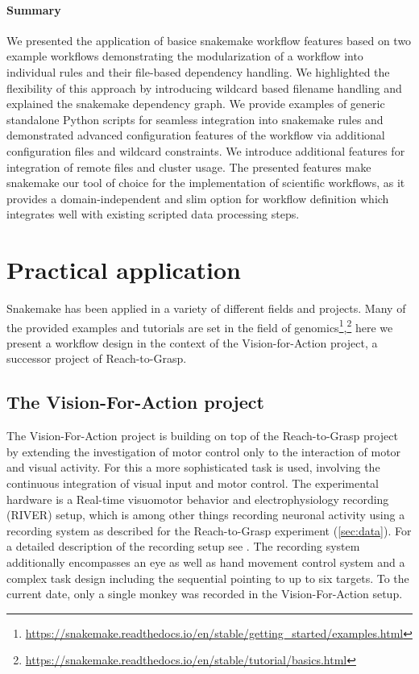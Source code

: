 \paragraph{Summary}
We presented the application of basice snakemake workflow features based on two example workflows demonstrating the modularization of a workflow into individual rules and their file-based dependency handling. We highlighted the flexibility of this approach by introducing wildcard based filename handling and explained the snakemake dependency graph. We provide examples of generic standalone Python scripts for seamless integration into snakemake rules and demonstrated advanced configuration features of the workflow via additional configuration files and wildcard constraints. We introduce additional features for integration of remote files and cluster usage.
The presented features make snakemake our tool of choice for the implementation of scientific workflows, as it provides a domain-independent and slim option for workflow definition which integrates well with existing scripted data processing steps.


\section{Practical application}
Snakemake has been applied in a variety of different fields and projects. Many of the provided examples and tutorials are set in the field of genomics\footnote{\url{https://snakemake.readthedocs.io/en/stable/getting_started/examples.html}},\footnote{\url{https://snakemake.readthedocs.io/en/stable/tutorial/basics.html}} here we present a workflow design in the context of the Vision-for-Action project, a successor project of Reach-to-Grasp.

\subsection{The Vision-For-Action project}
The Vision-For-Action project is building on top of the Reach-to-Grasp project by extending the investigation of motor control only to the interaction of motor and visual activity. For this a more sophisticated task is used, involving the continuous integration of visual input and motor control. The experimental hardware is a Real-time visuomotor behavior and electrophysiology recording (RIVER) setup, which is among other things recording neuronal activity using a  recording system as described for the Reach-to-Grasp experiment (\cref{sec:data}). For a detailed description of the recording setup see \citet{deHaan_2018,deHaan_2018a}. The recording system additionally encompasses an eye as well as hand movement control system and a complex task design including the sequential pointing to up to six targets. To the current date, only a single monkey was recorded in the Vision-For-Action setup.
